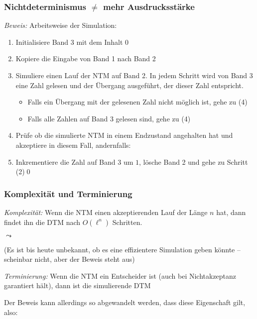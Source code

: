 \documentclass[aspectratio=1610,onlymath]{beamer}
\begin{document}
\begin{frame}[t]\frametitle{Nichtdeterminismus $\neq$ mehr Ausdrucksstärke}


\emph{Beweis:} Arbeitsweise der Simulation:\pause
\begin{enumerate}[(1)]
\item Initialisiere Band 3 mit dem Inhalt $0$\pause
\item Kopiere die Eingabe von Band 1 nach Band 2\pause
\item Simuliere einen Lauf der NTM auf Band 2. In jedem Schritt wird von Band 3 eine Zahl gelesen
und der Übergang ausgeführt, der dieser Zahl entspricht.
\begin{itemize}
\item Falls ein Übergang mit der gelesenen Zahl nicht möglich ist, gehe zu (4)
\item Falls alle Zahlen auf Band 3 gelesen sind, gehe zu (4)
\end{itemize}\pause
\item Prüfe ob die simulierte NTM in einem Endzustand angehalten hat und akzeptiere in diesem Fall, andernfalls:
\item Inkrementiere die Zahl auf Band 3 um $1$, lösche Band 2 und gehe zu Schritt (2)\qed
\end{enumerate}

\end{frame}

\begin{frame}[t]\frametitle{Komplexität und Terminierung}


\emph{Komplexität:}
Wenn die NTM einen akzeptierenden Lauf der Länge $n$ hat, dann findet ihn die DTM nach
$O(\ell^n)$ Schritten.
\medskip

$\leadsto$ 

(Es ist bis heute unbekannt, ob es eine effizientere Simulation geben könnte -- scheinbar nicht, aber der Beweis steht aus)\pause\bigskip

\emph{Terminierung:}
Wenn die NTM ein Entscheider ist (auch bei Nichtakzeptanz garantiert hält), dann ist die
simulierende DTM \ghost{\ldots}\\\pause {}
\medskip

Der Beweis kann allerdings so abgewandelt werden, dass diese Eigenschaft gilt, also:


\end{frame}
\end{document}
